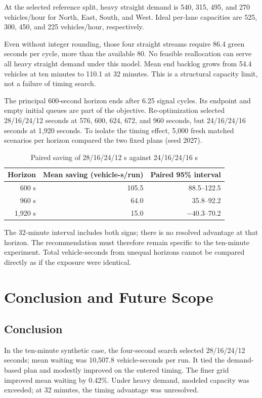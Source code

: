 \documentclass[12pt,a4paper]{report}
\begin{document}
At the selected reference split, heavy straight demand is 540, 315, 495, and 270 vehicles/hour for North, East, South, and West. Ideal per-lane capacities are 525, 300, 450, and 225 vehicles/hour, respectively.

Even without integer rounding, those four straight streams require 86.4 green seconds per cycle, more than the available 80. No feasible reallocation can serve all heavy straight demand under this model. Mean end backlog grows from 54.4 vehicles at ten minutes to 110.1 at 32 minutes. This is a structural capacity limit, not a failure of timing search.

The principal 600-second horizon ends after 6.25 signal cycles. Its endpoint and empty initial queues are part of the objective. Re-optimization selected 28/16/24/12 seconds at 576, 600, 624, 672, and 960 seconds, but 24/16/24/16 seconds at 1,920 seconds. To isolate the timing effect, 5,000 fresh matched scenarios per horizon compared the two fixed plans (seed 2027).

\begin{table}[H]\centering\caption{Paired saving of 28/16/24/12 s against 24/16/24/16 s}\label{tab:horizon}
\begin{tabular}{rrr}\toprule
Horizon & Mean saving (vehicle-s/run) & Paired 95\% interval\\\midrule
600 s & 105.5 & 88.5--122.5\\
960 s & 64.0 & 35.8--92.2\\
1,920 s & 15.0 & $-40.3$--70.2\\\bottomrule
\end{tabular}\end{table}

The 32-minute interval includes both signs; there is no resolved advantage at that horizon. The recommendation must therefore remain specific to the ten-minute experiment. Total vehicle-seconds from unequal horizons cannot be compared directly as if the exposure were identical.

\chapter{Conclusion and Future Scope}
\section{Conclusion}
In the ten-minute synthetic case, the four-second search selected 28/16/24/12 seconds; mean waiting was 10,507.8 vehicle-seconds per run. It tied the demand-based plan and modestly improved on the entered timing. The finer grid improved mean waiting by 0.42\%. Under heavy demand, modeled capacity was exceeded; at 32 minutes, the timing advantage was unresolved.
\end{document}
